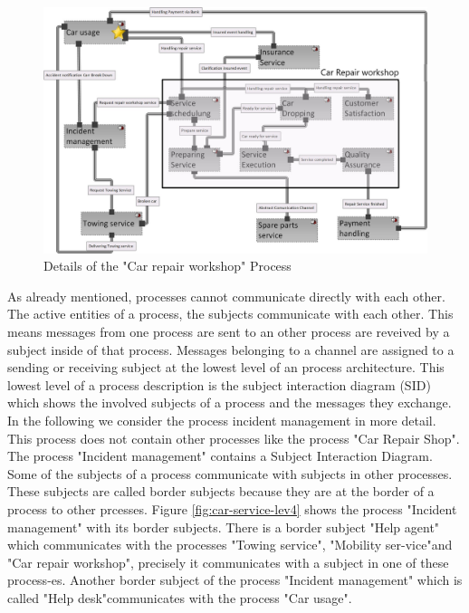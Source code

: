 \begin{figure}[htbp]
	\centering
	\includegraphics[width=0.8\linewidth]{Figures/Chapter5/figures-hierarchy/Car-Service-Lev3}
	\caption[Details of the "Car repair workshop" Process]{Details of the "Car repair workshop" Process}
	\label{fig:car-service-lev3}
\end{figure}

As already mentioned, processes cannot communicate directly with each other. The active entities of a process, the subjects communicate with each other. This means messages from one process are sent to an other process are reveived by a subject inside of that process. Messages belonging to a channel are assigned to a sending or receiving subject at the lowest level of an process architecture. This lowest level of a process description is the subject interaction diagram (SID) which shows the involved subjects of a process and the messages they exchange. In the following we consider the process incident management in more detail. This process does not contain other processes like the process "Car Repair Shop". The process "Incident management" contains a Subject Interaction Diagram. Some of the subjects of a process communicate with subjects in other processes. These subjects are called border subjects because they are at the border of a process to other prcesses. Figure \ref{fig:car-service-lev4} shows the process "Incident management" with its border subjects. There is a border subject "Help agent" which communicates with the processes "Towing service", "Mobility ser-vice"and  "Car repair workshop", precisely it communicates with a subject in one of these process-es. Another border subject of the process "Incident management" which is called "Help desk"communicates with the process "Car usage".\\

